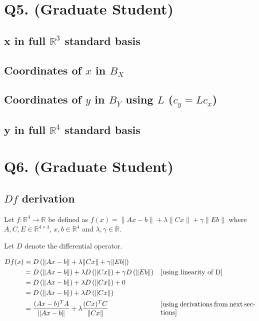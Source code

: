 \documentclass{article}
\begin{document}
    \section{Q5. (Graduate Student)}

    \subsection{x in full $\mathbb{R}^3$ standard basis}
    \subsection{Coordinates of $x$ in $B_X$}
    \subsection{Coordinates of $y$ in $B_Y$ using $L$ ($c_y = Lc_x$)}
    \subsection{y in full $\mathbb{R}^4$ standard basis}


    \section{Q6. (Graduate Student)}
    \subsection{ $Df$ derivation }
    Let $f: \mathbb{R}^4 \rightarrow \mathbb{R}$ be defined as $f(x) = \| Ax - b \| + \lambda \| Cx \| + \gamma \| Eb \|$ where $A, C, E \in \mathbb{R}^{4 \times 4}$, $x,b \in \mathbb{R}^4$ and $\lambda,\gamma \in \mathbb{R}$.

    Let $D$ denote the differential operator.

    \begin{align*}
    Df(x) &= D \left( \| Ax - b \| + \lambda \| Cx \| + \gamma \| Eb \| \right) &\\
    &= D \left( \| Ax - b \| \right) +  \lambda D \left( \| Cx \| \right) +  \gamma D \left( \| Eb \| \right) & \parbox[c]{0.4\linewidth}{[using linearity of D]}\\
    &= D \left( \| Ax - b \| \right) +  \lambda D \left( \| Cx \| \right) +  0 &\\
    &= D \left( \| Ax - b \| \right) +  \lambda D \left( \| Cx \| \right) &\\
    &= \frac{ (Ax-b)^T A }{\| Ax-b \| } + \lambda \frac{(Cx)^T C}{ \| Cx \| } & \parbox[c]{0.4\linewidth}{[using derivations from next sections]}
    \end{align*}
\end{document}
